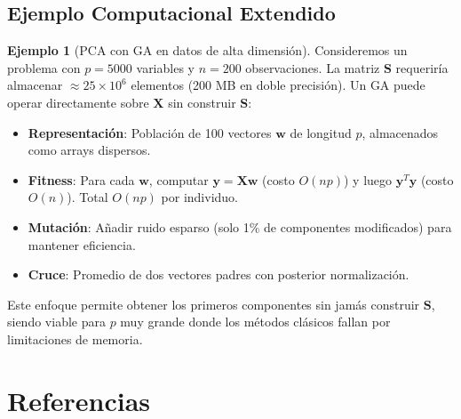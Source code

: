 \documentclass[11pt,a4paper]{article}
\theoremstyle{plain}
\theoremstyle{definition}
\newtheorem{example}[theorem]{Ejemplo}
\theoremstyle{remark}
\newcommand{\1}{\mathbf{1}}
\begin{document}
\subsection{Ejemplo Computacional Extendido}

\begin{example}[PCA con GA en datos de alta dimensión]
Consideremos un problema con $p=5000$ variables y $n=200$ observaciones. La matriz $\mathbf{S}$ requeriría almacenar $\approx 25\times 10^6$ elementos (200 MB en doble precisión). Un GA puede operar directamente sobre $\mathbf{X}$ sin construir $\mathbf{S}$:

\begin{itemize}
\item \textbf{Representación}: Población de 100 vectores $\mathbf{w}$ de longitud $p$, almacenados como arrays dispersos.
\item \textbf{Fitness}: Para cada $\mathbf{w}$, computar $\mathbf{y} = \mathbf{X}\mathbf{w}$ (costo $O(np)$) y luego $\mathbf{y}^T\mathbf{y}$ (costo $O(n)$). Total $O(np)$ por individuo.
\item \textbf{Mutación}: Añadir ruido esparso (solo 1\% de componentes modificados) para mantener eficiencia.
\item \textbf{Cruce}: Promedio de dos vectores padres con posterior normalización.
\end{itemize}

Este enfoque permite obtener los primeros componentes sin jamás construir $\mathbf{S}$, siendo viable para $p$ muy grande donde los métodos clásicos fallan por limitaciones de memoria.
\end{example}

\section{Referencias}
\label{sec:refs}
\end{document}
